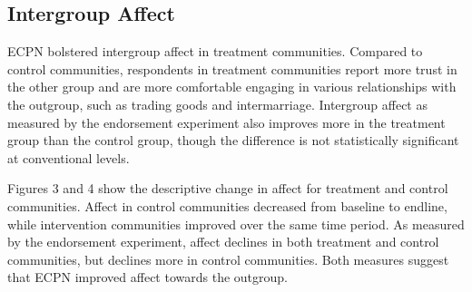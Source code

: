 \documentclass[11pt]{article}
\begin{document}
\hypertarget{intergroup-affect}{%
\subsection{Intergroup Affect}\label{intergroup-affect}}

ECPN bolstered intergroup affect in treatment communities. Compared to
control communities, respondents in treatment communities report more
trust in the other group and are more comfortable engaging in various
relationships with the outgroup, such as trading goods and
intermarriage. Intergroup affect as measured by the endorsement
experiment also improves more in the treatment group than the control
group, though the difference is not statistically significant at
conventional levels.

Figures 3 and 4 show the descriptive change in affect for treatment and
control communities. Affect in control communities decreased from
baseline to endline, while intervention communities improved over the
same time period. As measured by the endorsement experiment, affect
declines in both treatment and control communities, but declines more in
control communities. Both measures suggest that ECPN improved affect
towards the outgroup.
\end{document}
